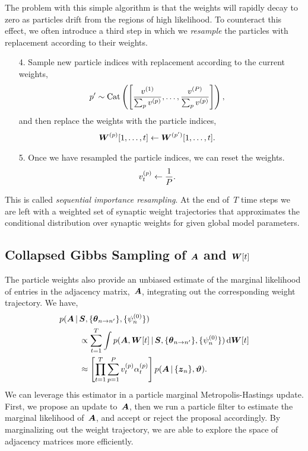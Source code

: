 The problem with this simple algorithm is that the weights will rapidly 
decay to zero as particles drift from the regions of high likelihood. 
To counteract this effect, we often introduce a third step in which we 
\emph{resample} the particles with replacement according to their weights. 
\begin{enumerate}
\item[4.] Sample new particle indices with replacement according to the current weights, 
  \begin{align*}
    p' &\sim \mathrm{Cat} \left(
         \left[ \frac{v^{(1)}}{\sum_{p} v^{(p)}}, \ldots,
         \frac{v^{(P)}}{\sum_{p} v^{(p)}} \right] \right),
  \end{align*}
  and then replace the weights with the particle indices,
  \begin{align*}
    \boldsymbol{W}^{(p)}[1,\ldots,t] &\leftarrow \boldsymbol{W}^{(p')}[1,\ldots,t].
  \end{align*}

\item[5.]   Once we have resampled the particle indices, we can reset the weights.
  \begin{align*}
    v_t^{(p)} &\leftarrow \frac{1}{P}.
  \end{align*}
\end{enumerate}
This is called \emph{sequential importance resampling}. At the end of~$T$
time steps we are left with a weighted set of synaptic weight trajectories
that approximates the conditional distribution over synaptic weights 
for given global model parameters.

\subsection{Collapsed Gibbs Sampling of $\boldsymbol{A}$ and $\boldsymbol{W}[t]$}
The particle weights also provide an unbiased estimate of the marginal
likelihood of entries in the adjacency matrix,~$\boldsymbol{A}$, integrating out
the corresponding weight trajectory. We have,
\begin{align*}
p(\boldsymbol{A} \,|\, & \boldsymbol{S}, \{\boldsymbol{\theta}_{n \to n'}\}, \{\psi_n^{(0)}\}) \\
&\propto  \sum_{t=1}^{T} \int  p( \boldsymbol{A}, \boldsymbol{W}[t] \,|\, \boldsymbol{S}, \{\boldsymbol{\theta}_{n \to n'}\}, \{\psi_n^{(0)}\}) \, \mathrm{d}\boldsymbol{W}[t] \\
&\approx \left[\prod_{t=1}^T \sum_{p=1}^P v_t^{(p)} \alpha_t^{(p)} \right] p(\boldsymbol{A} \,|\, \{\boldsymbol{z}_n\}, \boldsymbol{\vartheta}).
\end{align*}
We can leverage this estimator in a particle marginal Metropolis-Hastings
\cite{Andrieu-2010} update. First, we propose an update to~$\boldsymbol{A}$, then
we run a particle filter to estimate the marginal likelihood of~$\boldsymbol{A}$, 
and accept or reject the proposal accordingly.
By marginalizing out the weight trajectory, we
are able to explore the space of adjacency matrices more efficiently.

